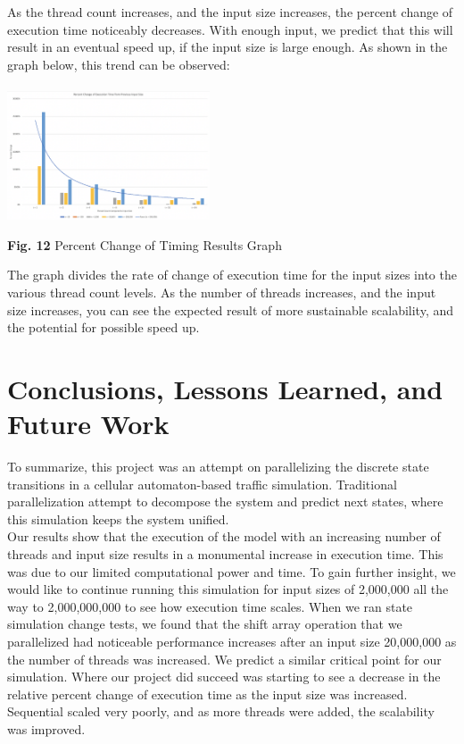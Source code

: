 \documentclass[conference]{IEEEtran}
\begin{document}
As the thread count increases, and the input size increases, the percent change of execution time noticeably decreases.  With enough input, we predict that this will result in an eventual speed up, if the input size is large enough. As shown in the graph below, this trend can be observed: \\ \\
\includegraphics[width=0.45\textwidth]{images/percentChangeGraph}
\begin{center}
	\textbf{Fig. 12} Percent Change of Timing Results Graph \\
\end{center}

The graph divides the rate of change of execution time for the input sizes into the various thread count levels. As the number of threads increases, and the input size increases, you can see the expected result of more sustainable scalability, and the potential for possible speed up. \\

\section{Conclusions, Lessons Learned, and Future Work}
To summarize, this project was an attempt on parallelizing the discrete state transitions in a cellular automaton-based traffic simulation. Traditional parallelization attempt to decompose the system and predict next states, where this simulation keeps the system unified. \\

Our results show that the execution of the model with an increasing number of threads and input size results in a monumental increase in execution time. This was due to our limited computational power and time. To gain further insight, we would like to continue running this simulation for input sizes of 2,000,000 all the way to 2,000,000,000 to see how execution time scales.  When we ran state simulation change tests, we found that the shift array operation that we parallelized had noticeable performance increases after an input size 20,000,000 as the number of threads was increased. We predict a similar critical point for our simulation. Where our project did succeed was starting to see a decrease in the relative percent change of execution time as the input size was increased. Sequential scaled very poorly, and as more threads were added, the scalability was improved. \\
\end{document}
